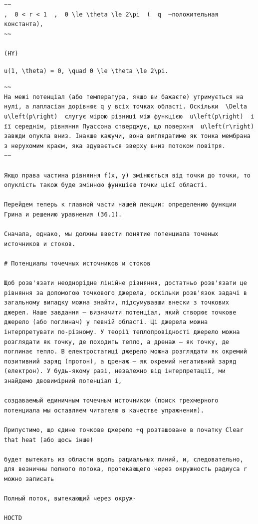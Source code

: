 \documentclass[
  ukrainian,
]{article}
\begin{document}
\begin{verbatim}
~~
,  0 < r < 1  ,  0 \le \theta \le 2\pi  (  q  —положительная константа),
~~

(HY)
\end{verbatim}

\texttt{u(1,\ \textbackslash{}theta)\ =\ 0,\ \textbackslash{}quad\ 0\ \textbackslash{}le\ \textbackslash{}theta\ \textbackslash{}le\ 2\textbackslash{}pi.}

\begin{verbatim}
~~
На межі потенціал (або температура, якщо ви бажаєте) утримується на нулі, а лапласіан дорівнює q у всіх точках області. Оскільки  \Delta u\left(p\right)  слугує мірою різниці між функцією  u\left(p\right)  і її середнім, рівняння Пуассона стверджує, що поверхня  u\left(r\right)  завжди опукла вниз. Інакше кажучи, вона виглядатиме як тонка мембрана з нерухомим краєм, яка здувається зверху вниз потоком повітря.
~~

Якщо права частина рівняння f(x, y) змінюється від точки до точки, то опуклість також буде змінною функцією точки цієї області.

Перейдем теперь к главной части нашей лекции: определению функции Грина и решению уравнения (36.1).

Сначала, однако, мы должны ввести понятие потенциала точеных источников и стоков.

# Потенциалы точечных источников и стоков

Щоб розв'язати неоднорідне лінійне рівняння, достатньо розв'язати це рівняння за допомогою точкового джерела, оскільки розв'язок задачі в загальному випадку можна знайти, підсумувавши внески з точкових джерел. Наше завдання — визначити потенціал, який створює точкове джерело (або поглинач) у певній області. Ці джерела можна інтерпретувати по-різному. У теорії теплопровідності джерело можна розглядати як точку, де походить тепло, а дренаж — як точку, де поглинає тепло. В електростатиці джерело можна розглядати як окремий позитивний заряд (протон), а дренаж — як окремий негативний заряд (електрон). У будь-якому разі, незалежно від інтерпретації, ми знайдемо двовимірний потенціал і,

создаваемый единичным точечным источником (поиск трехмерного потенциала мы оставляем читателю в качестве упражнения).

Припустимо, що єдине точкове джерело +q розташоване в початку Clear that heat (або щось інше)

будет вытекать из области вдоль радиальных линий, и, следовательно, для везничны полного потока, протекающего через окружность радиуса r можно записать

Полный поток, вытекающий через окруж-

HOCTD
\end{verbatim}
\end{document}
